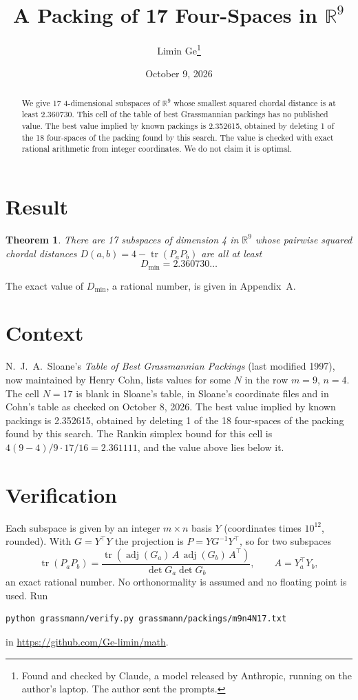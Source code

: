 \documentclass[11pt,a4paper]{article}
\title{A Packing of 17 Four-Spaces in $\mathbb{R}^{9}$}
\author{Limin Ge\thanks{Found and checked by Claude, a model released by Anthropic, running on the author's laptop. The author sent the prompts.}}
\date{October 9, 2026}
\newtheorem*{theorem}{Theorem}
\begin{document}
\maketitle
\begin{abstract}
We give 17 4-dimensional subspaces of $\mathbb{R}^{9}$ whose smallest squared chordal distance is at least 2.360730. This cell of the table of best Grassmannian packings has no published value. The best value implied by known packings is 2.352615, obtained by deleting 1 of the 18 four-spaces of the packing found by this search. The value is checked with exact rational arithmetic from integer coordinates. We do not claim it is optimal.
\end{abstract}

\section{Result}
\begin{theorem}
There are 17 subspaces of dimension 4 in $\mathbb{R}^{9}$ whose pairwise squared chordal distances $D(a,b) = 4 - \operatorname{tr}(P_aP_b)$ are all at least
\[ D_{\min} = 2.360730\ldots \]
\end{theorem}
The exact value of $D_{\min}$, a rational number, is given in Appendix~A.


\section{Context}
N.~J.~A.~Sloane's \emph{Table of Best Grassmannian Packings} (last modified 1997), now maintained by Henry Cohn, lists values for some $N$ in the row $m=9$, $n=4$. The cell $N=17$ is blank in Sloane's table, in Sloane's coordinate files and in Cohn's table as checked on October 8, 2026. The best value implied by known packings is 2.352615, obtained by deleting 1 of the 18 four-spaces of the packing found by this search. The Rankin simplex bound for this cell is $4(9-4)/9\cdot 17/16 = 2.361111$, and the value above lies below it.


\section{Verification}
Each subspace is given by an integer $m\times n$ basis $Y$ (coordinates times $10^{12}$, rounded). With $G=Y^\top Y$ the projection is $P=YG^{-1}Y^\top$, so for two subspaces
\[ \operatorname{tr}(P_aP_b)=\frac{\operatorname{tr}(\operatorname{adj}(G_a)\,A\,\operatorname{adj}(G_b)\,A^\top)}{\det G_a\det G_b},\qquad A=Y_a^\top Y_b, \]
an exact rational number. No orthonormality is assumed and no floating point is used. Run
\begin{verbatim}
python grassmann/verify.py grassmann/packings/m9n4N17.txt
\end{verbatim}
in \url{https://github.com/Ge-limin/math}.
\end{document}
